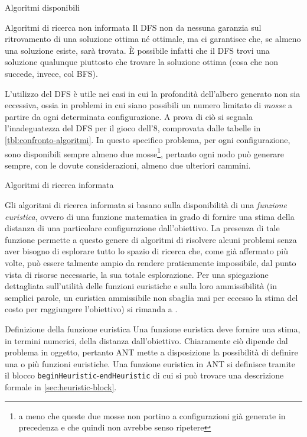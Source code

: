 \begin{chapter}{Algoritmi disponibili}
\begin{section}{Algoritmi di ricerca non informata}
    Il DFS non da nessuna garanzia sul ritrovamento di una soluzione ottima n\'e
    ottimale, ma ci garantisce che, se almeno una soluzione esiste, sar\`a trovata.
    \`E possibile infatti che il DFS trovi una soluzione qualunque piuttosto che
    trovare la soluzione ottima (cosa che non succede, invece, col BFS).

    L'utilizzo del DFS \`e utile nei casi in cui la profondit\`a dell'albero generato
    non sia eccessiva, ossia in problemi in cui siano possibili un numero limitato
    di \textit{mosse} a partire da ogni determinata configurazione. A prova di ci\`o
    si segnala l'inadeguatezza del DFS per il gioco dell'8, comprovata dalle tabelle
    in \ref{tbl:confronto-algoritmi}. In questo specifico problema, per ogni configurazione,
    sono disponibili sempre almeno due mosse\footnote{a meno che queste due mosse non
    portino a configurazioni gi\`a generate in precedenza e che quindi non avrebbe senso
    ripetere}, pertanto ogni nodo pu\`o generare sempre, con le dovute considerazioni,
    almeno due ulteriori cammini.
\end{section}

\begin{section}{Algoritmi di ricerca informata}
\label{sec:informed-algos}

Gli algoritmi di ricerca informata si basano sulla disponibilit\`a di una \textit{funzione
euristica}, ovvero di una funzione matematica in grado di fornire una stima della distanza
di una particolare configurazione dall'obiettivo.
La presenza di tale funzione permette a questo genere di algoritmi di risolvere alcuni
problemi senza aver bisogno di esplorare tutto lo spazio di ricerca che, come gi\`a affermato
pi\`u volte, pu\`o essere talmente ampio da rendere praticamente impossibile, dal punto vista
di risorse necessarie, la sua totale esplorazione. Per una spiegazione dettagliata
sull'utilit\`a delle funzioni euristiche e sulla loro ammissibilit\`a (in semplici parole, un
euristica ammissibile non sbaglia mai per eccesso la stima del costo per raggiungere
l'obiettivo) si rimanda a \cite{norvig03}.

    \begin{subsection}{Definizione della funzione euristica}
    \label{sec:heuristicdef}
    Una funzione euristica deve fornire una stima, in termini numerici, della distanza
    dall'obiettivo. Chiaramente ci\`o dipende dal problema in oggetto, pertanto ANT mette a
    disposizione la possibilit\`a di definire una o pi\`u funzioni euristiche.
    Una funzione euristica in ANT si definisce tramite il blocco \verb,beginHeuristic,-\verb,endHeuristic,
    di cui si pu\`o trovare una descrizione formale in \ref{sec:heuristic-block}.


\end{subsection}
\end{section}
\end{chapter}
